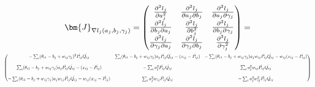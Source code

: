 \documentclass[doc]{apa7}
\newcommand\scalemath[2]{\scalebox{#1}{\mbox{\ensuremath{\displaystyle #2}}}}
\begin{document}
  \begin{equation}
    \begin{gathered}
      \bm{J}_{\nabla l_j(a_j, b_j, \gamma_j)} = 
      \begin{pmatrix}
        \frac{\partial^2 l_j}{\partial a_j^2} & 
        \frac{\partial^2 l_j}{\partial a_j \partial b_j} &
        \frac{\partial^2 l_j}{\partial a_j \partial \gamma_j}\\
        \frac{\partial^2 l_j}{\partial b_j \partial a_j} &
        \frac{\partial^2 l_j}{\partial b_j^2} &
        \frac{\partial^2 l_j}{\partial b_j \partial \gamma_j}\\
        \frac{\partial^2 l_j}{\partial \gamma_j \partial a_j} &
        \frac{\partial^2 l_j}{\partial \gamma_j \partial b_j} &
        \frac{\partial^2 l_j}{\partial \gamma_j^2}
      \end{pmatrix} = \\
      \scalemath{0.55}{
      \begin{pmatrix}
        -\sum_i(\theta_{i1}-b_j+w_{ij}\gamma_j)^2 \dot{P_{ij}}\dot{Q_{ij}} &
        \sum_i(\theta_{i1}-b_j+w_{ij}\gamma_j)a_j\dot{P_{ij}}\dot{Q_{ij}} - 
        (x_{ij}-\dot{P_{ij}}) &
        -\sum_i(\theta_{i1}-b_j+w_{ij}\gamma_j)a_jw_{ij}\dot{P_{ij}}\dot{Q_
        {ij}}-w_{ij}(x_{ij}-\dot{P_{ij}})\\
        \\
        \sum_i(\theta_{i1}-b_j+w_{ij}\gamma_j)a_j\dot{P_{ij}}\dot{Q_{ij}}-(x_
        {ij}-\dot{P_{ij}}) &
        -\sum_i a_j^2 \dot{P_{ij}}\dot{Q_{ij}} &
        \sum_i a_j^2 w_{ij} \dot{P_{ij}} \dot{Q_{ij}}\\
        \\
        -\sum_i (\theta_{i1}-b_j+w_{ij}\gamma_j)a_jw_{ij}\dot{P_{ij}}\dot{Q_
        {ij}} - w_{ij}(x_{ij}-\dot{P_{ij}}) &
        \sum_i a_j^2 w_{ij} \dot{P_{ij}} \dot{Q_{ij}} &
        -\sum_i a_j^2 w_{ij}^2 \dot{P_{ij}} \dot{Q_{ij}} 
      \end{pmatrix}
      }
    \end{gathered}
  \end{equation}
\end{document}

